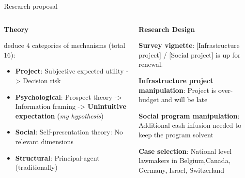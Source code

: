 \begin{frame}{Research proposal}

\begin{columns}
  \begin{column}[T]{0.475\textwidth}
    \textbf{\color{kon4}Theory}

    \vspace*{0.2cm}

  \textcite[][]{Sleesman2012} deduce 4 categories of mechanisms (total 16):
  \begin{itemize}
    \item \textbf{Project}: Subjective expected utility -> Decision risk
    \item \textbf{Psychological}: Prospect theory -> Information framing -> \textbf{Unintuitive expectation} (\textit{my hypothesis})
    \item \textbf{Social}: Self-presentation theory: No relevant dimensions
    \item \textbf{Structural}: Principal-agent (traditionally)
  \end{itemize}







    
  \end{column}

  \begin{column}[T]{0.475\textwidth}

    \textbf{\color{kon4}Research Design}

    \vspace*{0.2cm}

    \textbf{Survey vignette}: [Infrastructure project] / [Social project] is up for renewal.

    \vspace{0.2cm}

    \textbf{Infrastructure project manipulation}: Project is over-budget and will be late

    \vspace{0.2cm}

    \textbf{Social program manipulation}: Additional cash-infusion needed to keep the program solvent 

    \vspace{0.2cm}

    \textbf{Case selection}: National level lawmakers in Belgium,Canada, Germany, Israel, Switzerland


    \vspace{0.2cm}
  \end{column}
\end{columns}


\end{frame}

